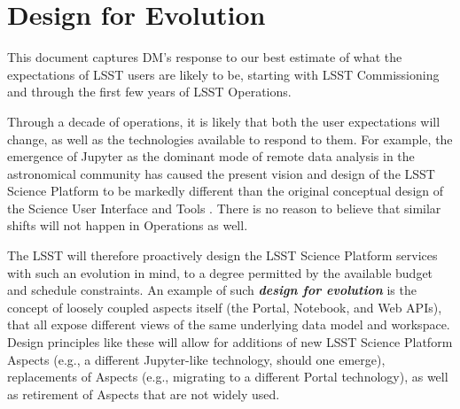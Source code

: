 \section{Design for Evolution\label{sec:evolution}}

This document captures DM's response to our best estimate of what the expectations of LSST users are likely to be, starting with LSST Commissioning and through the first few years of LSST Operations.

Through a decade of operations, it is likely that both the user expectations will change, as well as the technologies available to respond to them.
For example, the emergence of Jupyter as the dominant mode of remote data analysis in the astronomical community has caused the present vision and design of the LSST Science Platform to be markedly different than the original conceptual design of the Science User Interface and Tools .
There is no reason to believe that similar shifts will not happen in Operations as well.

The LSST will therefore proactively design the LSST Science Platform services with such an evolution in mind, to a degree permitted by the available budget and schedule constraints.
An example of such \textbf\emph{design for evolution} is the concept of loosely coupled aspects itself (the Portal, Notebook, and Web APIs), that all expose different views of the same underlying data model and workspace.
Design principles like these will allow for additions of new LSST Science Platform Aspects (e.g., a different Jupyter-like technology, should one emerge), replacements of Aspects (e.g., migrating to a different Portal technology), as well as retirement of Aspects that are not widely used.
